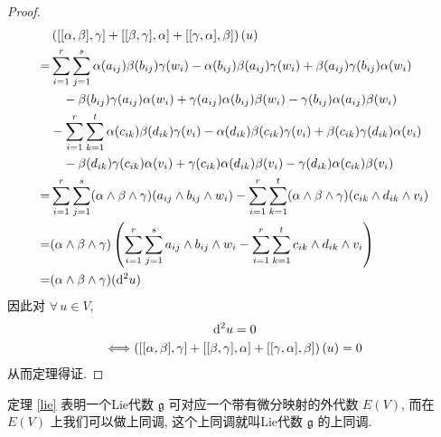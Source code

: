 \begin{proof}
\begin{align*}
            &\left([[\alpha,\beta],\gamma]+[[\beta,\gamma],\alpha]+[[\gamma,\alpha],\beta]\right)(u) \\
            =&\sum_{i=1}^{r}\sum_{j=1}^{s}\alpha(a_{ij})\beta(b_{ij})\gamma(w_i)-\alpha(b_{ij})\beta(a_{ij})\gamma(w_i)+\beta(a_{ij})\gamma(b_{ij})\alpha(w_i) \\
            &\quad-\beta(b_{ij})\gamma(a_{ij})\alpha(w_i)+\gamma(a_{ij})\alpha(b_{ij})\beta(w_i)-\gamma(b_{ij})\alpha(a_{ij})\beta(w_i) \\
            &-\sum_{i=1}^{r}\sum_{k=1}^{t}\alpha(c_{ik})\beta(d_{ik})\gamma(v_i)-\alpha(d_{ik})\beta(c_{ik})\gamma(v_i)+\beta(c_{ik})\gamma(d_{ik})\alpha(v_i) \\
            &\quad-\beta(d_{ik})\gamma(c_{ik})\alpha(v_i)+\gamma(c_{ik})\alpha(d_{ik})\beta(v_i)-\gamma(d_{ik})\alpha(c_{ik})\beta(v_i) \\
            =&\sum_{i=1}^{r}\sum_{j=1}^{s}(\alpha\wedge\beta\wedge\gamma)(a_{ij}\wedge b_{ij}\wedge w_i)-\sum_{i=1}^{r}\sum_{k=1}^{t}(\alpha\wedge\beta\wedge\gamma)(c_{ik}\wedge d_{ik}\wedge v_i) \\
            =&(\alpha\wedge\beta\wedge\gamma)\left(\sum_{i=1}^{r}\sum_{j=1}^{s}a_{ij}\wedge b_{ij}\wedge w_i-\sum_{i=1}^{r}\sum_{k=1}^{t}c_{ik}\wedge d_{ik}\wedge v_i\right) \\
            =&(\alpha\wedge\beta\wedge\gamma)({\rm d}^2 u)
        \end{align*}
        因此对 $\forall\,u\in V$,
        \begin{gather*}
            {\rm d}^2 u = 0 \\
            \Longleftrightarrow \left([[\alpha,\beta],\gamma]+[[\beta,\gamma],\alpha]+[[\gamma,\alpha],\beta]\right)(u) = 0
        \end{gather*}
        从而定理得证.
    \end{proof}
    定理 \ref{lie} 表明一个{\rm Lie}代数 $\mathfrak{g}$ 可对应一个带有微分映射的外代数 $E(V)$, 而在 $E(V)$ 上我们可以做上同调,
    这个上同调就叫{\rm Lie}代数 $\mathfrak{g}$ 的上同调.
